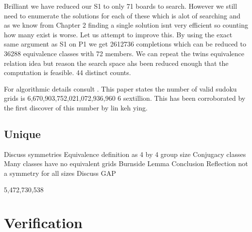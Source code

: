 \documentclass[a4paper,11pt]{report}
\newcounter{row}
\newcounter{col}
\newcounter{rowb}
\newcounter{colb}
\newcommand\setrowb[3]{
  \setcounter{colb}{1}
  \foreach \n in {#1, #2, #3} {
    \edef\x{\value{colb} - 0.5}
    \edef\y{3.5 - \value{rowb}}
    \node[anchor=center] at (\x, \y) {\n};
    \stepcounter{colb}
  }
  \stepcounter{rowb}
}
\begin{document}
\begin{figure}[h!]
\centering
{}
\caption{\label{fig:twins}}
\end{figure}

Brilliant we have reduced our S1 to only 71 boards to search. However we still need to enumerate the solutions for each of these which is alot of searching and as we know from Chapter 2 finding a single solution isnt very efficient so counting how many exist is worse. Let us attempt to improve this. By using the exact same argument as S1 on P1 we get 2612736 completions which can be reduced to 36288 equivalence classes with 72 members. We can repeat the twins equivalence relation idea but \cite{} reason the search space ahs been reduced enough that the computation is feasible. 44 distinct counts.

For algorithmic details consult \cite{}. This paper states the number of valid sudoku grids is 6,670,903,752,021,072,936,960 6 sextillion. This has been corroborated by the first discover of this number by \cite{} lin keh ying.
 
\subsection{Unique} 

Discuss symmetries
Equivalence definition as 4 by 4
group size
Conjugacy classes
Many classes have no equivalent grids
Burnside Lemma
Conclusion
Reflection not a symmetry for all sizes
Discuss GAP

5,472,730,538

\section{Verification}
\end{document}
